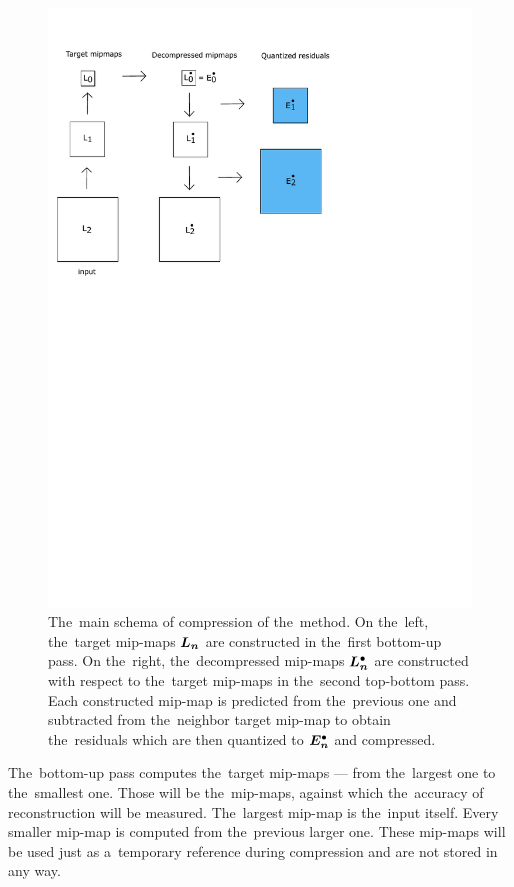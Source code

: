 	\begin{figure}
		\includegraphics[trim={0 15cm 6cm 1cm}, clip, width=1\textwidth]{figures/main_schema.pdf}\centering
		\caption{The~main schema of compression of the~method. On the~left, the~target mip-maps $\lnorm{n}$ are constructed in the~first bottom-up pass. On the~right, the~decompressed mip-maps $\ldot{n}$ are constructed with respect to the~target mip-maps in the~second top-bottom pass. Each constructed mip-map is predicted from the~previous one and subtracted from the~neighbor target mip-map to obtain the~residuals which are then quantized to $\objdot{E}{n}$ and compressed.}
		\label{fig:main_schema}
	\end{figure}

The~bottom-up pass computes the~target mip-maps --- from the~largest one to the~smallest one. Those will be the~mip-maps, against which the~accuracy of reconstruction will be measured. The~largest mip-map is the~input itself. Every smaller mip-map is computed from the~previous larger one. These mip-maps will be used just as a~temporary reference during compression and are not stored in any way.

